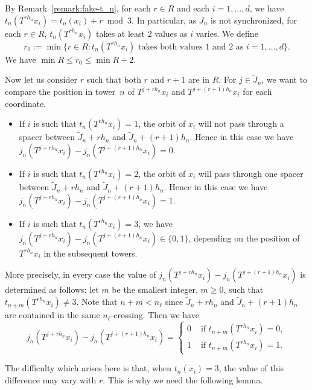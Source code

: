 \documentclass[AHL,Unicode,longabstracts]{cedram}
\begin{document}
By Remark~\ref{remark:fake-t_n}, for each $r\in R$ and each $i=1,\ldots,d$, we have $t_n(T^{rh_n}x_i)=t_n(x_i)+r\bmod 3$. In particular, as $J_n$ is not synchronized, for each $r\in R$, $t_n(T^{rh_n}x_i)$ takes at least 2 values as $i$ varies. We define
\[
r_0:=\min \{r\in R: t_n(T^{rh_n}x_i)\text{ takes both values 1 and 2 as }i=1,\ldots,d\}.
\]
We have $\min R\le r_0\le \min R+2$.

Now let us consider $r$ such that both $r$ and $r+1$ are in $R$. For $j\in\tilde J_n$, we want to compare the position in tower~$n$ of $T^{j+rh_n}x_i$ and $T^{j+(r+1)h_n}x_i$ for each coordinate.
\begin{itemize}
\item If $i$ is such that $t_n(T^{rh_n}x_i)=1$, the orbit of $x_i$ will not pass through a spacer between $\tilde J_n+rh_n$ and $\tilde J_n+(r+1)h_n$. Hence in this case we have $j_n(T^{j+rh_n}x_i)-j_n(T^{j+(r+1)h_n}x_i)=0$.
\item If $i$ is such that $t_n(T^{rh_n}x_i)=2$, the orbit of $x_i$ will pass through one spacer between $\tilde J_n+rh_n$ and $\tilde J_n+(r+1)h_n$. Hence in this case we have $j_n(T^{j+rh_n}x_i)-j_n(T^{j+(r+1)h_n}x_i)=1$.
\item If $i$ is such that $t_n(T^{rh_n}x_i)=3$, we have $j_n(T^{j+rh_n}x_i)-j_n(T^{j+(r+1)h_n}x_i)\in\{0,1\}$, depending on the position of $T^{rh_n}x_i$ in the subsequent towers.
\end{itemize}
More precisely, in every case the value of $j_n(T^{j+rh_n}x_i)-j_n(T^{j+(r+1)h_n}x_i)$ is determined as follows: let $m$ be the smallest integer, $m\ge 0$, such that $t_{n+m}(T^{rh_n}x_i)\neq 3$. Note that $n+m<n_\ell$ since $\tilde J_n+rh_n$ and $\tilde J_n+(r+1)h_n$ are contained in the same $n_\ell$-crossing. Then we have
\begin{equation}\label{eq:how_to_decide}
j_n(T^{j+rh_n}x_i)-j_n(T^{j+(r+1)h_n}x_i)=
\begin{cases}
0 & \text{ if }t_{n+m}(T^{rh_n}x_i)=0,\\
1 & \text{ if }t_{n+m}(T^{rh_n}x_i)=1.
\end{cases}
\end{equation}

The difficulty which arises here is that, when $t_n(x_i)=3$, the value of this difference may vary with $r$. This is why we need the following lemma.
\end{document}
